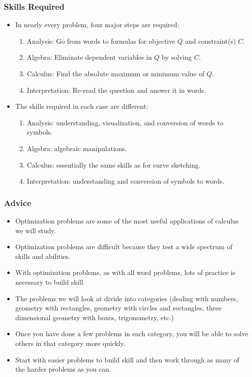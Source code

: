 \documentclass[serif,ignorenonframetext]{beamer}
\begin{document}
\begin{frame}
  \frametitle{Skills Required}
  \begin{itemize}[<+->]
  \item In nearly every problem, four major steps are required:
    \begin{enumerate}[<+->]
    \item Analysis: Go from words to formulas for objective $Q$ 
      and constraint(s) $C$.
    \item Algebra: Eliminate dependent variables in $Q$ by solving $C$.
    \item Calculus: Find the absolute maximum or minimum value of $Q$.
    \item Interpretation: Re-read the question and answer it in words.
    \end{enumerate}
  \item The skills required in each case are different:
    \begin{enumerate}[<+->]
    \item Analysis: understanding, 
       visualization, and conversion of words to symbols.
    \item Algebra: algebraic manipulations.
    \item Calculus: essentially the same skills as for curve sketching.
    \item Interpretation: understanding and conversion of symbols to words.
    \end{enumerate}
  \end{itemize}
\end{frame}

\begin{frame}
  \frametitle{Advice}
  \begin{itemize}[<+->]
  \item Optimization problems are some of the most useful applications
    of calculus we will study.
  \item Optimization problems are difficult because they test a wide 
    spectrum of skills and abilities.
  \item With optimization problems, as with all word problems,
    lots of practice is necessary to build skill.
  \item The problems we will look at divide into categories (dealing with
    numbers, geometry with rectangles, geometry with circles and rectangles,
    three dimensional geometry with boxes, trigonometry, etc.)
  \item Once you have done a few problems in each category, you will be able
    to solve others in that category more quickly.
  \item Start with easier problems to build skill and then 
    work through as many of the harder problems as you can.
  \end{itemize}
\end{frame}
\end{document}
